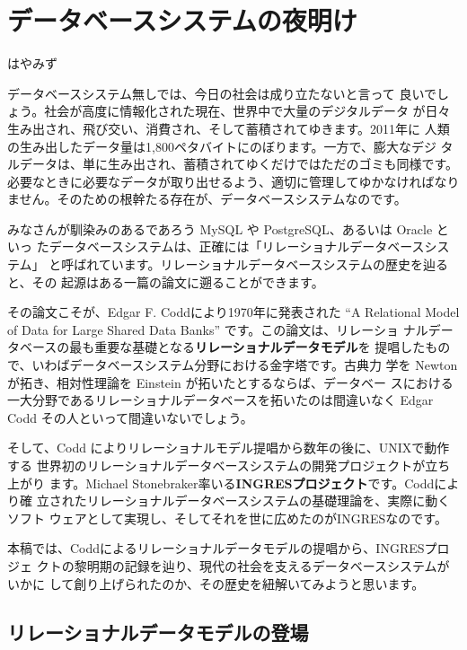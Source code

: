 
\cleardoublepage
\plainifnotempty

\chapter{データベースシステムの夜明け}

\begin{flushright}
はやみず
\end{flushright}

\lettrine{デ}ータベースシステム無しでは、今日の社会は成り立たないと言って
良いでしょう。社会が高度に情報化された現在、世界中で大量のデジタルデータ
が日々生み出され、飛び交い、消費され、そして蓄積されてゆきます。2011年に
人類の生み出したデータ量は1,800ペタバイトにのぼります。一方で、膨大なデジ
タルデータは、単に生み出され、蓄積されてゆくだけではただのゴミも同様です。
必要なときに必要なデータが取り出せるよう、適切に管理してゆかなければなり
ません。そのための根幹たる存在が、データベースシステムなのです。

みなさんが馴染みのあるであろう MySQL や PostgreSQL、あるいは Oracle といっ
たデータベースシステムは、正確には「リレーショナルデータベースシステム」
と呼ばれています。リレーショナルデータベースシステムの歴史を辿ると、その
起源はある一篇の論文に遡ることができます。

その論文こそが、Edgar F.  Coddにより1970年に発表された ``A Relational
Model of Data for Large Shared Data Banks'' です。この論文は、リレーショ
ナルデータベースの最も重要な基礎となる{\bf リレーショナルデータモデル}を
提唱したもので、いわばデータベースシステム分野における金字塔です。古典力
学を Newton が拓き、相対性理論を Einstein が拓いたとするならば、データベー
スにおける一大分野であるリレーショナルデータベースを拓いたのは間違いなく
Edgar Codd その人といって間違いないでしょう。

そして、Codd によりリレーショナルモデル提唱から数年の後に、UNIXで動作する
世界初のリレーショナルデータベースシステムの開発プロジェクトが立ち上がり
ます。Michael Stonebraker率いる{\bf INGRESプロジェクト}です。Coddにより確
立されたリレーショナルデータベースシステムの基礎理論を、実際に動くソフト
ウェアとして実現し、そしてそれを世に広めたのがINGRESなのです。

本稿では、Coddによるリレーショナルデータモデルの提唱から、INGRESプロジェ
クトの黎明期の記録を辿り、現代の社会を支えるデータベースシステムがいかに
して創り上げられたのか、その歴史を紐解いてみようと思います。

\section{リレーショナルデータモデルの登場}

